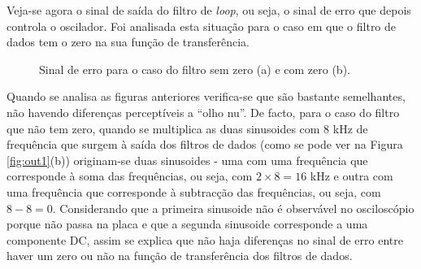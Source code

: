 \documentclass[11pt]{article}
\numberwithin{equation}{section}
\begin{document}
Veja-se agora o sinal de saída do filtro de \textit{loop}, ou seja, o sinal de erro que depois controla o oscilador. Foi analisada esta situação para o caso em que o filtro de dados tem o zero na sua função de transferência. 

\begin{figure}[H]
	\centering
	\hspace{8mm}
	\vspace{-0.8em}
	\caption{Sinal de erro para o caso do filtro sem zero (a) e com zero (b).}
	\vspace{-0.8em}
\end{figure}

Quando se analisa as figuras anteriores verifica-se que são bastante semelhantes, não havendo diferenças perceptíveis a ``olho nu''. De facto, para o caso do filtro que não tem zero, quando se multiplica as duas sinusoides com 8 kHz de frequência que surgem à saída dos filtros de dados (como se pode ver na Figura \ref{fig:out1}(b)) originam-se duas sinusoides - uma com uma frequência que corresponde à soma das frequências, ou seja, com $2 \times 8 = 16$ kHz e outra com uma frequência que corresponde à subtracção das frequências, ou seja, com $8 - 8 = 0$. Considerando que a primeira sinusoide não é observável no osciloscópio porque não passa na placa e que a segunda sinusoide corresponde a uma componente DC, assim se explica que não haja diferenças no sinal de erro entre haver um zero ou não na função de transferência dos filtros de dados.
\end{document}
